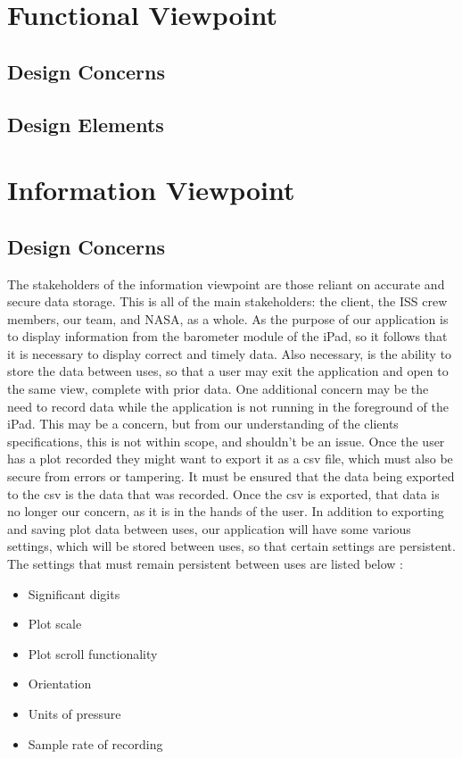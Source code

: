 \documentclass[onecolumn, draftclsnofoot,10pt, compsoc]{IEEEtran}
\begin{document}
\section{Functional Viewpoint}
\subsection{Design Concerns}
\subsection{Design Elements}

\section{Information Viewpoint}
\subsection{Design Concerns}
The stakeholders of the information viewpoint are those reliant on accurate and secure data storage.
This is all of the main stakeholders: the client, the ISS crew members, our team, and NASA, as a whole.
As the purpose of our application is to display information from the barometer module of the iPad, so it follows that it is necessary to display correct and timely data.
Also necessary, is the ability to store the data between uses, so that a user may exit the application and open to the same view, complete with prior data.
One additional concern may be the need to record data while the application is not running in the foreground of the iPad.
This may be a concern, but from our understanding of the clients specifications, this is not within scope, and shouldn't be an issue.
Once the user has a plot recorded they might want to export it as a csv file, which must also be secure from errors or tampering.
It must be ensured that the data being exported to the csv is the data that was recorded.
Once the csv is exported, that data is no longer our concern, as it is in the hands of the user.
In addition to exporting and saving plot data between uses, our application will have some various settings, which will be stored between uses, so that certain settings are persistent.
The settings that must remain persistent between uses are listed below \cite{reqDoc}:
\begin{itemize}
	\item Significant digits
	\item Plot scale
	\item Plot scroll functionality
	\item Orientation
	\item Units of pressure
	\item Sample rate of recording
\end{itemize}
\end{document}
